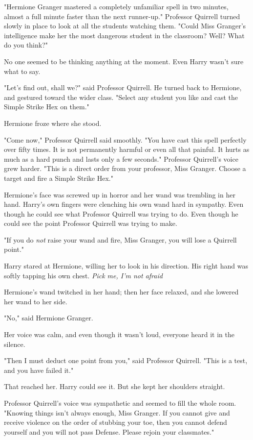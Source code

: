 "Hermione Granger mastered a completely unfamiliar spell in two minutes, almost
a full minute faster than the next runner-up." Professor Quirrell turned slowly
in place to look at all the students watching them. "Could Miss Granger's
intelligence make her the most dangerous student in the classroom? Well? What
do you think?"

No one seemed to be thinking anything at the moment. Even Harry wasn't sure
what to say.

"Let's find out, shall we?" said Professor Quirrell. He turned back to
Hermione, and gestured toward the wider class. "Select any student you like and
cast the Simple Strike Hex on them."

Hermione froze where she stood.

"Come now," Professor Quirrell said smoothly. "You have cast this spell
perfectly over fifty times. It is not permanently harmful or even all that
painful. It hurts as much as a hard punch and lasts only a few seconds."
Professor Quirrell's voice grew harder. "This is a direct order from your
professor, Miss Granger. Choose a target and fire a Simple Strike Hex."

Hermione's face was screwed up in horror and her wand was trembling in her
hand. Harry's own fingers were clenching his own wand hard in sympathy. Even
though he could see what Professor Quirrell was trying to do. Even though he
could see the point Professor Quirrell was trying to make.

"If you do \emph{not} raise your wand and fire, Miss Granger, you will lose a
Quirrell point."

Harry stared at Hermione, willing her to look in his direction. His right hand
was softly tapping his own chest. \emph{Pick me, I'm not afraid{\el}}

Hermione's wand twitched in her hand; then her face relaxed, and she lowered
her wand to her side.

"No," said Hermione Granger.

Her voice was calm, and even though it wasn't loud, everyone heard it in the
silence.

"Then I must deduct one point from you," said Professor Quirrell. "This is a
test, and you have failed it."

That reached her. Harry could see it. But she kept her shoulders straight.

Professor Quirrell's voice was sympathetic and seemed to fill the whole room.
"Knowing things isn't always enough, Miss Granger. If you cannot give and
receive violence on the order of stubbing your toe, then you cannot defend
yourself and you will not pass Defense. Please rejoin your classmates."

